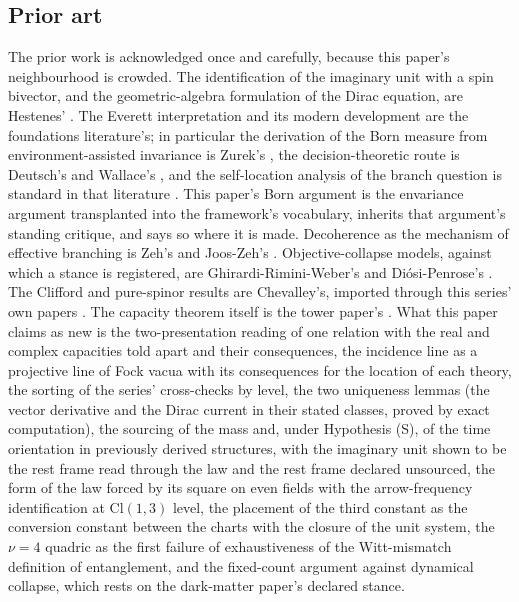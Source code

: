 \documentclass[11pt]{article}
\theoremstyle{definition}
\theoremstyle{plain}
\providecommand{\Cl}{}\renewcommand{\Cl}{\mathrm{Cl}}
\begin{document}
\subsection*{Prior art}
\label{c:note.one-relation.setting-prior-art}
The prior work is acknowledged once and carefully, because this paper's neighbourhood is crowded. The identification of the imaginary unit with a spin bivector, and the geometric-algebra formulation of the Dirac equation, are Hestenes' \cite{Hestenes1967, Hestenes1975}. The Everett interpretation and its modern development are the foundations literature's; in particular the derivation of the Born measure from environment-assisted invariance is Zurek's \cite{Zurek2005}, the decision-theoretic route is Deutsch's and Wallace's \cite{Deutsch1999, Wallace2012}, and the self-location analysis of the branch question is standard in that literature \cite{Saunders2010}. This paper's Born argument is the envariance argument transplanted into the framework's vocabulary, inherits that argument's standing critique, and says so where it is made. Decoherence as the mechanism of effective branching is Zeh's and Joos-Zeh's \cite{Zeh1970, JoosZeh1985}. Objective-collapse models, against which a stance is registered, are Ghirardi-Rimini-Weber's and Di\'osi-Penrose's \cite{GRW1986, Penrose1996}. The Clifford and pure-spinor results are Chevalley's, imported through this series' own papers \cite{ButlerT1, ButlerT9}. The capacity theorem itself is the tower paper's \cite[Thm.~4.3]{ButlerT3}. What this paper claims as new is the two-presentation reading of one relation with the real and complex capacities told apart and their consequences, the incidence line as a projective line of Fock vacua with its consequences for the location of each theory, the sorting of the series' cross-checks by level, the two uniqueness lemmas (the vector derivative and the Dirac current in their stated classes, proved by exact computation), the sourcing of the mass and, under Hypothesis (S), of the time orientation in previously derived structures, with the imaginary unit shown to be the rest frame read through the law and the rest frame declared unsourced, the form of the law forced by its square on even fields with the arrow-frequency identification at $\Cl(1,3)$ level, the placement of the third constant as the conversion constant between the charts with the closure of the unit system, the $\nu = 4$ quadric as the first failure of exhaustiveness of the Witt-mismatch definition of entanglement, and the fixed-count argument against dynamical collapse, which rests on the dark-matter paper's declared stance.
\end{document}
